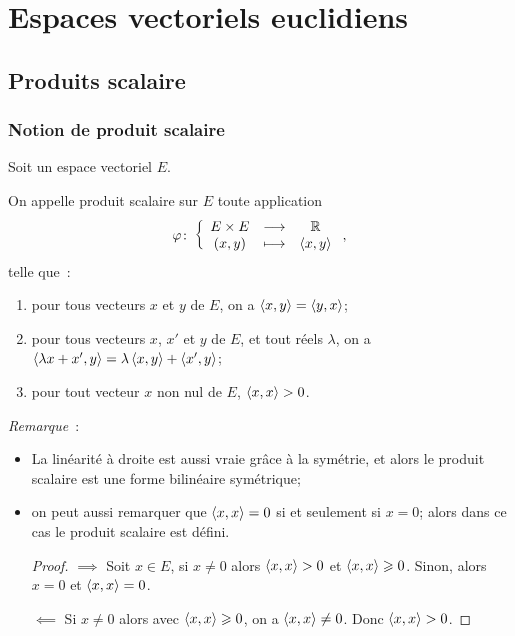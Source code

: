 \chapter{Espaces vectoriels euclidiens}
\label{chap:espaceseuclidiens}
\minitoc
\minilof
\minilot

\section{Produits scalaire}

\subsection{Notion de produit scalaire}

Soit un espace vectoriel $E$.
\begin{defdef}
  On appelle produit scalaire sur $E$ toute application
  \begin{equation}
    \varphi\colon \left\{\begin{array}{ccc} E \times E & \longrightarrow &\mathbb{R}\\ (x,y) & \longmapsto & \left\langle{x},{y}\right\rangle \end{array} \right.,
  \end{equation}
  telle que~:
  \begin{enumerate}
  \item pour tous vecteurs $x$ et $y$ de $E$, on a $\left\langle{x},{y}\right\rangle=\left\langle{y},{x}\right\rangle$;
  \item pour tous vecteurs $x$, $x'$ et $y$ de $E$, et tout réels $\lambda$, on a $\left\langle{\lambda x +x'},{y}\right\rangle = \lambda\left\langle{x},{y}\right\rangle + \left\langle{x'},{y}\right\rangle$;
  \item pour tout vecteur $x$ non nul de $E$, $\left\langle{x},{x}\right\rangle>0$.
  \end{enumerate}
\end{defdef}
\emph{Remarque}~:
\begin{itemize}
\item La linéarité à droite est aussi vraie grâce à la symétrie, et alors le produit scalaire est une forme bilinéaire symétrique;
\item on peut aussi remarquer que $\left\langle{x},{x}\right\rangle=0$ si et seulement si $x=0$; alors dans ce cas le produit scalaire est défini.
  \begin{proof}
    $\implies$ Soit $x \in E$, si $x\neq 0$ alors $\left\langle{x},{x}\right\rangle>0$ et $\left\langle{x},{x}\right\rangle\geqslant 0$. Sinon, alors $x=0$ et $\left\langle{x},{x}\right\rangle=0$.

    $\impliedby$ Si $x \neq 0$ alors avec $\left\langle{x},{x}\right\rangle\geqslant 0$, on a $\left\langle{x},{x}\right\rangle \neq 0$. Donc $\left\langle{x},{x}\right\rangle>0$.
  \end{proof}
\end{itemize}

